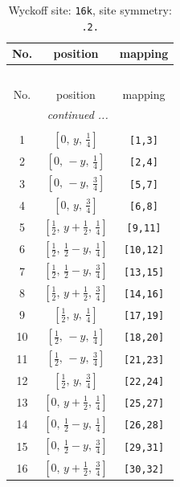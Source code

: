 \documentclass[fleqn,8pt]{jsarticle}
\begin{document}
\renewcommand{\arraystretch}{1.2}
\begin{longtable}{ccc}
\caption{Wyckoff site: {\tt 16k}, site symmetry: {\tt .2.}}
 \\
 \hline \hline
No. & position & mapping \\ \hline \endfirsthead

\multicolumn{2}{l}{\tablename\ \thetable{}} \\
 \hline \hline
No. & position & mapping \\ \hline \endhead

 \hline \hline
\multicolumn{2}{r}{\footnotesize\it continued ...} \\ \endfoot

 \hline \hline
\multicolumn{2}{r}{} \\ \endlastfoot

1 & $\left[ 0,\, y,\, \frac{1}{4} \right]$ & {\tt [1,3]} \\ \hline
2 & $\left[ 0,\, - y,\, \frac{1}{4} \right]$ & {\tt [2,4]} \\ \hline
3 & $\left[ 0,\, - y,\, \frac{3}{4} \right]$ & {\tt [5,7]} \\ \hline
4 & $\left[ 0,\, y,\, \frac{3}{4} \right]$ & {\tt [6,8]} \\ \hline
5 & $\left[ \frac{1}{2},\, y + \frac{1}{2},\, \frac{1}{4} \right]$ & {\tt [9,11]} \\ \hline
6 & $\left[ \frac{1}{2},\, \frac{1}{2} - y,\, \frac{1}{4} \right]$ & {\tt [10,12]} \\ \hline
7 & $\left[ \frac{1}{2},\, \frac{1}{2} - y,\, \frac{3}{4} \right]$ & {\tt [13,15]} \\ \hline
8 & $\left[ \frac{1}{2},\, y + \frac{1}{2},\, \frac{3}{4} \right]$ & {\tt [14,16]} \\ \hline
9 & $\left[ \frac{1}{2},\, y,\, \frac{1}{4} \right]$ & {\tt [17,19]} \\ \hline
10 & $\left[ \frac{1}{2},\, - y,\, \frac{1}{4} \right]$ & {\tt [18,20]} \\ \hline
11 & $\left[ \frac{1}{2},\, - y,\, \frac{3}{4} \right]$ & {\tt [21,23]} \\ \hline
12 & $\left[ \frac{1}{2},\, y,\, \frac{3}{4} \right]$ & {\tt [22,24]} \\ \hline
13 & $\left[ 0,\, y + \frac{1}{2},\, \frac{1}{4} \right]$ & {\tt [25,27]} \\ \hline
14 & $\left[ 0,\, \frac{1}{2} - y,\, \frac{1}{4} \right]$ & {\tt [26,28]} \\ \hline
15 & $\left[ 0,\, \frac{1}{2} - y,\, \frac{3}{4} \right]$ & {\tt [29,31]} \\ \hline
16 & $\left[ 0,\, y + \frac{1}{2},\, \frac{3}{4} \right]$ & {\tt [30,32]} \\
\end{longtable}
\end{document}
